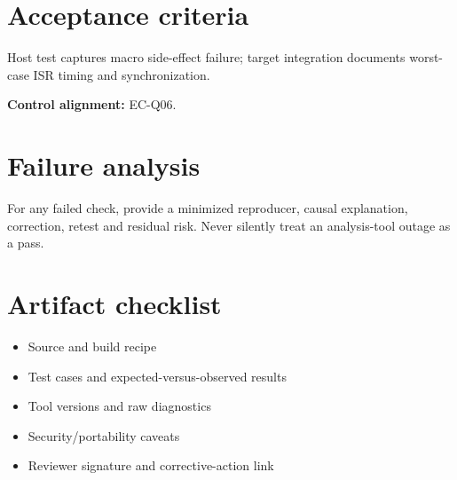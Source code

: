 \documentclass[10pt,letterpaper]{article}
\begin{document}
\section{Acceptance criteria}
Host test captures macro side-effect failure; target integration documents worst-case ISR timing and synchronization.

\textbf{Control alignment:} EC-Q06.
\section{Failure analysis}
For any failed check, provide a minimized reproducer, causal explanation, correction, retest and residual risk. Never silently treat an analysis-tool outage as a pass.
\section{Artifact checklist}
\begin{itemize}
\item Source and build recipe
\item Test cases and expected-versus-observed results
\item Tool versions and raw diagnostics
\item Security/portability caveats
\item Reviewer signature and corrective-action link
\end{itemize}
\end{document}
